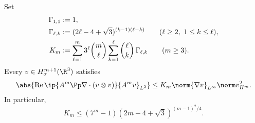 \begin{lemma}
\label{f:lem:transport-commutator}
Set
\begin{align}
 \Gamma_{1,1}&:=1,\notag\\
 \Gamma_{\ell,k}
 &:=(2\ell-4+\sqrt3)^{(k-1)(\ell-k)}
 \qquad(\ell\ge2,\ 1\le k\le\ell),
 \label{f:eq:explicit-Gamma-lk}\\
 K_m&:=
 \sum_{\ell=1}^{m}3^\ell\binom m\ell
 \sum_{k=1}^{\ell}\binom\ell k\,\Gamma_{\ell,k}
 \qquad(m\ge3).
 \label{f:eq:explicit-commutator-constant}
\end{align}
Every \(v\in H^{m+1}_\sigma(\R^3)\) satisfies
\begin{equation}
 \abs{\operatorname{Re}
 \ip{A^m\Pp\nabla\cdot(v\otimes v)}{A^mv}_{L^2}}
 \le K_m\norm{\nabla v}_{L^\infty}\norm v_{H^m}^2.
 \label{f:eq:transport-commutator}
\end{equation}
In particular,
\begin{equation}
 K_m\le(7^m-1)(2m-4+\sqrt3)^{(m-1)^2/4}.
 \label{f:eq:explicit-commutator-upper-bound}
\end{equation}
\end{lemma}

